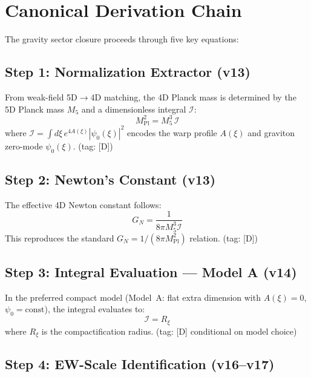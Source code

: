 \documentclass[11pt,a4paper]{article}
\newcommand{\Rxi}{R_\xi}
\newcommand{\Mpl}{M_{\mathrm{Pl}}}
\newcommand{\Mfive}{M_5}
\newcommand{\calI}{\mathcal{I}}
\newcommand{\GN}{G_N}
\begin{document}
\section{Canonical Derivation Chain}

The gravity sector closure proceeds through five key equations:

\subsection{Step 1: Normalization Extractor (v13)}

From weak-field 5D$\to$4D matching, the 4D Planck mass is determined by the
5D Planck mass $\Mfive$ and a dimensionless integral $\calI$:
\begin{equation}
\boxed{\Mpl^2 = \Mfive^3 \, \calI}
\label{eq:normalization}
\end{equation}
where $\calI = \int d\xi \, e^{4A(\xi)} |\psi_0(\xi)|^2$ encodes the warp profile
$A(\xi)$ and graviton zero-mode $\psi_0(\xi)$. \hfill (tag: [D])

\subsection{Step 2: Newton's Constant (v13)}

The effective 4D Newton constant follows:
\begin{equation}
\GN = \frac{1}{8\pi \Mfive^3 \calI}
\label{eq:GN}
\end{equation}
This reproduces the standard $\GN = 1/(8\pi \Mpl^2)$ relation. \hfill (tag: [D])

\subsection{Step 3: Integral Evaluation --- Model A (v14)}

In the preferred compact model (Model~A: flat extra dimension with
$A(\xi) = 0$, $\psi_0 = \mathrm{const}$), the integral evaluates to:
\begin{equation}
\calI = \Rxi
\label{eq:I-Rxi}
\end{equation}
where $\Rxi$ is the compactification radius. \hfill (tag: [D] conditional on model choice)

\subsection{Step 4: EW-Scale Identification (v16--v17)}
\end{document}
